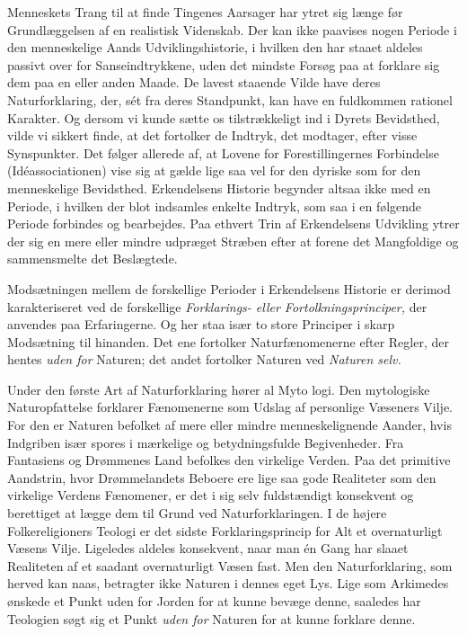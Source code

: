 \documentclass[12pt,a4paper]{article}
\newcommand{\opage}[1]{\marginnote{\footnotesize\textit{[#1]}}}
\begin{document}
Menneskets Trang til at finde Tingenes Aarsager har ytret sig længe
før Grundlæggelsen af en realistisk Videnskab. Der kan ikke paavises
nogen Periode i den menneskelige Aands Udviklingshistorie, i hvilken
den har staaet aldeles passivt over for Sanseindtrykkene, uden det
mindste Forsøg paa at forklare sig dem paa en eller anden Maade. De
lavest staaende Vilde have deres Naturforklaring, der, sét fra deres
Standpunkt, kan have en fuldkommen rationel Karakter. Og dersom vi
kunde sætte os tilstrækkeligt ind i Dyrets Bevidsthed, vilde vi sikkert
finde, at det fortolker de Indtryk, det modtager, efter visse
Synspunkter. Det følger allerede af, at Lovene for Forestillingernes
Forbindelse (Idéassociationen) vise sig at gælde lige saa vel for den
dyriske som for den menneskelige Bevidsthed. Erkendelsens Historie
begynder altsaa ikke med en Periode, i hvilken der blot indsamles
enkelte Indtryk, som saa i en følgende Periode forbindes og bearbejdes.
Paa ethvert Trin af Erkendelsens Udvikling ytrer der sig en mere eller
mindre udpræget Stræben efter at forene det Mangfoldige og
sammensmelte det Beslægtede.

Modsætningen mellem de forskellige Perioder i Erkendelsens Historie er
derimod karakteriseret ved de forskellige \emph{Forklarings- eller
Fortolkningsprinciper,} der anvendes paa Erfaringerne. Og her staa
især to store Principer i skarp Modsætning til hinanden. Det ene
fortolker Naturfænomenerne efter Regler, der hentes \emph{uden for} Naturen;
det andet fortolker Naturen ved \emph{Naturen selv.}

Under den første Art af Naturforklaring hører al Myto%
\opage{3}logi. Den
mytologiske Naturopfattelse forklarer Fænomenerne som Udslag af
personlige Væseners Vilje. For den er Naturen befolket af mere eller
mindre menneskelignende Aander, hvis Indgriben især spores i mærkelige
og betydningsfulde Begivenheder. Fra Fantasiens og Drømmenes Land
befolkes den virkelige Verden. Paa det primitive Aandstrin, hvor
Drømmelandets Beboere ere lige saa gode Realiteter som den virkelige
Verdens Fænomener, er det i sig selv fuldstændigt konsekvent og
berettiget at lægge dem til Grund ved Naturforklaringen. I de højere
Folkereligioners Teologi er det sidste Forklaringsprincip for Alt et
overnaturligt Væsens Vilje. Ligeledes aldeles konsekvent, naar man én
Gang har slaaet Realiteten af et saadant overnaturligt Væsen fast. Men
den Naturforklaring, som herved kan naas, betragter ikke Naturen i
dennes eget Lys. Lige som Arkimedes ønskede et Punkt uden for Jorden
for at kunne bevæge denne, saaledes har Teologien søgt sig et Punkt
\emph{uden for} Naturen for at kunne forklare denne.
\end{document}
